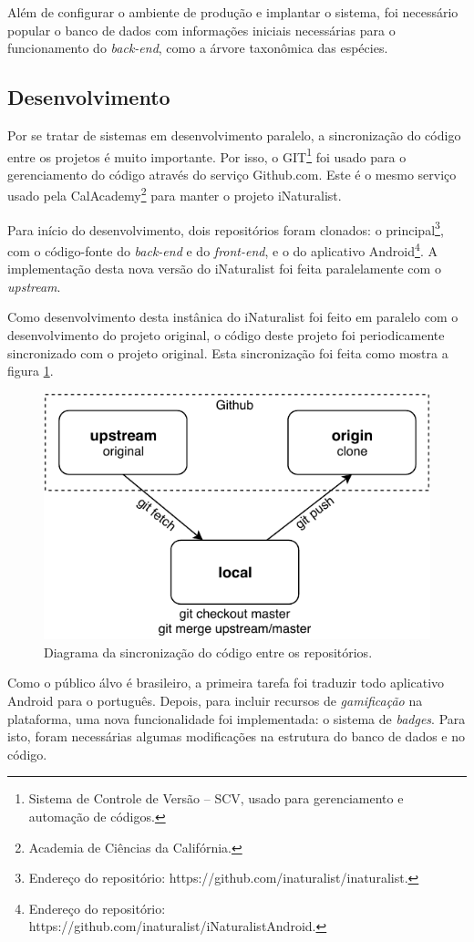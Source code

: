 Além de configurar o ambiente de produção e implantar o sistema, foi necessário popular o banco de dados com informações iniciais necessárias para o funcionamento do \emph{back-end}, como a árvore taxonômica das espécies.

\subsection{Desenvolvimento}
Por se tratar de sistemas em desenvolvimento paralelo, a sincronização do código entre os projetos é muito importante. Por isso, o GIT\footnote{Sistema de Controle de Versão -- SCV, usado para gerenciamento e automação de códigos.} foi usado para o gerenciamento do código através do serviço Github.com. Este é o mesmo serviço usado pela CalAcademy\footnote{Academia de Ciências da Califórnia.} para manter o projeto iNaturalist.

Para início do desenvolvimento, dois repositórios foram clonados: o principal\footnote{Endereço do repositório: https://github.com/inaturalist/inaturalist.}, com o código-fonte do \emph{back-end} e do \emph{front-end}, e o do aplicativo Android\footnote{Endereço do repositório: https://github.com/inaturalist/iNaturalistAndroid.}. A implementação desta nova versão do iNaturalist foi feita paralelamente com o \emph{upstream}.

Como desenvolvimento desta instânica do iNaturalist foi feito em paralelo com o desenvolvimento do projeto original, o código deste projeto foi periodicamente sincronizado com o projeto original. Esta sincronização foi feita como mostra a figura \ref{fig:git}. 

\begin{figure}[h!]
  \centering
  \includegraphics[width=.6\textwidth]{figures/github_diagram.pdf}
  \caption{Diagrama da sincronização do código entre os repositórios.}
  \label{fig:git}
\end{figure}

Como o público álvo é brasileiro, a primeira tarefa foi traduzir todo aplicativo Android para o português. Depois, para incluir recursos de \emph{gamificação} na plataforma, uma nova funcionalidade foi implementada: o sistema de \emph{badges}. Para isto, foram necessárias algumas modificações na estrutura do banco de dados e no código.

